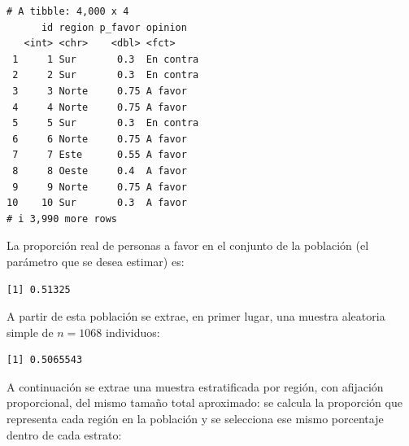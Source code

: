 \documentclass[
  spanish,
  a4paper,
]{scrreport}
\newenvironment{Shaded}{\begin{snugshade}}{\end{snugshade}}
\newcommand{\AttributeTok}[1]{\textcolor[rgb]{0.40,0.45,0.13}{#1}}
\newcommand{\FunctionTok}[1]{\textcolor[rgb]{0.28,0.35,0.67}{#1}}
\newcommand{\NormalTok}[1]{\textcolor[rgb]{0.00,0.23,0.31}{#1}}
\newcommand{\OtherTok}[1]{\textcolor[rgb]{0.00,0.23,0.31}{#1}}
\newcommand{\SpecialCharTok}[1]{\textcolor[rgb]{0.37,0.37,0.37}{#1}}
\newcommand{\StringTok}[1]{\textcolor[rgb]{0.13,0.47,0.30}{#1}}
\theoremstyle{definition}
\theoremstyle{definition}
\theoremstyle{remark}
\begin{document}
\begin{verbatim}
# A tibble: 4,000 x 4
      id region p_favor opinion  
   <int> <chr>    <dbl> <fct>    
 1     1 Sur       0.3  En contra
 2     2 Sur       0.3  En contra
 3     3 Norte     0.75 A favor  
 4     4 Norte     0.75 A favor  
 5     5 Sur       0.3  En contra
 6     6 Norte     0.75 A favor  
 7     7 Este      0.55 A favor  
 8     8 Oeste     0.4  A favor  
 9     9 Norte     0.75 A favor  
10    10 Sur       0.3  A favor  
# i 3,990 more rows
\end{verbatim}

La proporción real de personas a favor en el conjunto de la población
(el parámetro que se desea estimar) es:

\begin{Shaded}
\end{Shaded}

\begin{verbatim}
[1] 0.51325
\end{verbatim}

A partir de esta población se extrae, en primer lugar, una muestra
aleatoria simple de \(n=1068\) individuos:

\begin{Shaded}
\end{Shaded}

\begin{verbatim}
[1] 0.5065543
\end{verbatim}

A continuación se extrae una muestra estratificada por región, con
afijación proporcional, del mismo tamaño total aproximado: se calcula la
proporción que representa cada región en la población y se selecciona
ese mismo porcentaje dentro de cada estrato:
\end{document}
